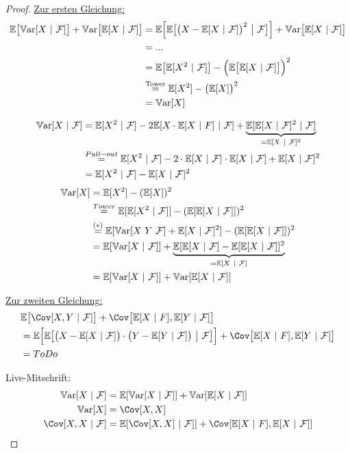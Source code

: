 \documentclass[12pt,a4paper]{article}
\begin{document}
\begin{proof}
\underline{Zur ersten Gleichung:}
\begin{align*}
\mathbb{E}\big[\mathbb{V}\text{ar}[X~|~\mathcal{F}]\big]+\mathbb{V}\text{ar}\big[\mathbb{E}[X~|~\mathcal{F}]\big]
&=\mathbb{E}\Big[\mathbb{E}\big[\big(X-\mathbb{E}[X~|~\mathcal{F}]\big)^2~\big|~\mathcal{F}\big]\Big]+\mathbb{V}\text{ar}\big[\mathbb{E}[X~|~\mathcal{F}]\big]\\
&=...\\
&=\mathbb{E}\big[\mathbb{E}[X^2~|~\mathcal{F}]\big]-\Big(\mathbb{E}\big[\mathbb{E}[X~|~\mathcal{F}]\big]\Big)^2\\
&\stackrel{\text{Tower}}{=}
\mathbb{E}[X^2]-\big(\mathbb{E}[X]\big)^2\\
&=\mathbb{V}\text{ar}[X]
\end{align*}

\begin{align*} %
\Var[X~|~\F]&=\E[X^2~|~\F]-2\E[X\cdot\E[X~|~F]~|~\F]+\underbrace{\E[\E[X~|~\F]^2~|~\F]}_{=\E[X~|~\F]^2}\\
&\stackeq{Pull-out}
\E[X^2~|~\F]-2\cdot\E[X~|~\F]\cdot\E[X~|~\F]+\E[X~|~\F]^2\\
&=\E[X^2~|~\F]-\E[X~|~\F]^2 
\end{align*}
\begin{align*}
\mathbb{V}\text{ar}[X]&=\mathbb{E}[X^2]-(\mathbb{E}[X])^2\\
&\stackrel{Tower}{=}
\mathbb{E}[\mathbb{E}[X^2~|~\mathcal{F}]]-(\mathbb{E}[\mathbb{E}[X~|~\mathcal{F}]])^2\\
&\stackrel{(*)}{=}
\mathbb{E}[\mathbb{V}\text{ar}[X~Y~\mathcal{F}]+\mathbb{E}[X~|~\mathcal{F}]^2]-(\mathbb{E}[\mathbb{E}[X~|~\mathcal{F}]])^2\\
&=
\mathbb{E}[\mathbb{V}\text{ar}[X~|~\mathcal{F}]]+\underbrace{\mathbb{E}[\mathbb{E}[X~|~\mathcal{F}]-\mathbb{E}[\mathbb{E}[X~|~\mathcal{F}]]^2}_{=\mathbb{E}[X~|~\mathcal{F}]}\\
&=\mathbb{E}[\mathbb{V}\text{ar}[X~|~\mathcal{F}]]+\mathbb{V}\text{ar}[\mathbb{E}[X~|~\mathcal{F}]]
\end{align*}

\underline{Zur zweiten Gleichung:}
\begin{align*}
&\E\big[\Cov[X,Y~|~\F]\big]+\Cov\big[\E[X~|~F],\E[Y~|~\F]\big]\\
&=\E\Big[\E\big[\big(X-\E[X~|~\F]\big)\cdot\big(Y-\E[Y~|~\F]\big)~\big|~\F\big]\Big]+\Cov\big[\E[X~|~F],\E[Y~|~\F]\big]\\
&=ToDo
\end{align*}

Live-Mitschrift:
\begin{align*}
\Var[X~|~\F]
&=\E[\Var[X~|~\F]]+\Var[\E[X~|~\F]]\\
\Var[X]&=\Cov[X,X]\\
\Cov[X,X~|~\F]&=
\E[\Cov[X,X]~|~\F]]+\Cov[\E[X~|~F],\E[X~|~\F]]
\end{align*}


\end{proof}
\end{document}
